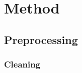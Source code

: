 \documentclass[11pt]{article}
\begin{document}





\section{Method}

\subsection{Preprocessing}


\subsubsection{Cleaning}
\end{document}
